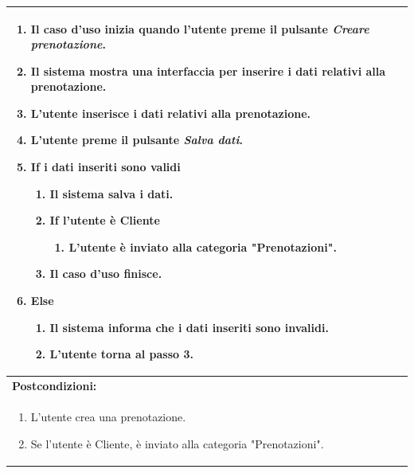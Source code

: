 \documentclass{article}
\begin{document}
\begin{table}[H]
\begin{tabular}{|p{\linewidth}|}
\begin{enumerate}
                            \item Il caso d'uso inizia quando l'utente preme il pulsante \emph{Creare prenotazione}.
                            \item Il sistema mostra una interfaccia per inserire i dati relativi alla prenotazione.
                            \item L'utente inserisce i dati relativi alla prenotazione.
                            \item L'utente preme il pulsante \emph{Salva dati}.
                            \item \textbf{If} i dati inseriti sono validi
                            \begin{enumerate}
                                \item Il sistema salva i dati.
                                \item \textbf{If} l'utente è Cliente
                                \begin{enumerate}
                                    \item L'utente è inviato alla categoria "Prenotazioni".
                                \end{enumerate}
                                \item Il caso d'uso finisce.
                            \end{enumerate}
                            \item \textbf{Else}
                            \begin{enumerate}
                                \item Il sistema informa che i dati inseriti sono invalidi.
                                \item L'utente torna al passo 3.
                            \end{enumerate}
                        \end{enumerate} \\
                        \hline
                        \cellcolor{gray!20}
                        \textbf{Postcondizioni:} \\
                        \cellcolor{gray!20}
                        \begin{minipage}{\linewidth}
                            \begin{enumerate}
                                \item L'utente crea una prenotazione.
                                \item Se l'utente è Cliente, è inviato alla categoria "Prenotazioni".

\end{enumerate}
\end{minipage}
\end{tabular}
\end{table}
\end{document}
